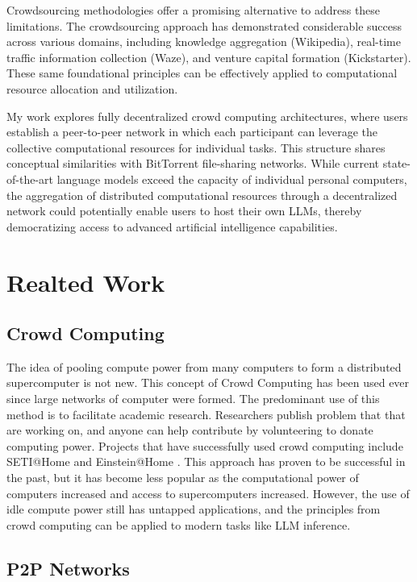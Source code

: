 \documentclass[preprint,twoside,11pt]{article}
\begin{document}
Crowdsourcing methodologies offer a promising alternative to address these limitations.
The crowdsourcing approach has demonstrated considerable success across various domains, including knowledge aggregation (Wikipedia),
real-time traffic information collection (Waze), and venture capital formation (Kickstarter).
These same foundational principles can be effectively applied to computational resource allocation and utilization.

My work explores fully decentralized crowd computing architectures,
where users establish a peer-to-peer network in which each participant can leverage the collective computational resources for individual tasks.
This structure shares conceptual similarities with BitTorrent file-sharing networks.
While current state-of-the-art language models exceed the capacity of individual personal computers,
the aggregation of distributed computational resources through a decentralized network could potentially enable users to host their own LLMs,
thereby democratizing access to advanced artificial intelligence capabilities.
\section{Realted Work}

\subsection{Crowd Computing}

The idea of pooling compute power from many computers to form a distributed supercomputer is not new. This concept of Crowd Computing
has been used ever since large networks of computer were formed. The predominant use of this method is to facilitate academic research.
Researchers publish problem that that are working on, and anyone can help contribute by volunteering to donate computing power.
Projects that have successfully used crowd computing include SETI@Home \citep{10.1145/581571.581573} and Einstein@Home \citep{Steltner_2021}.
This approach has proven to be successful in the past, but it has become less popular as the computational power of computers increased and access to supercomputers increased.
However, the use of idle compute power still has untapped applications, and the principles from crowd computing can be applied to modern tasks like LLM inference.

\subsection{P2P Networks}
\end{document}
